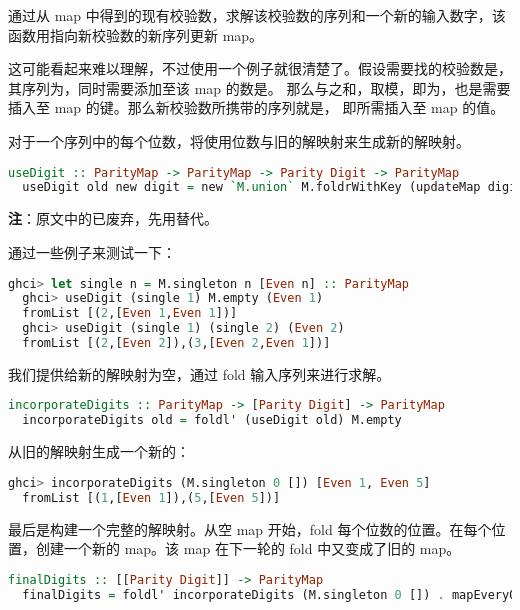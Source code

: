 \documentclass[./main.tex]{subfiles}
\begin{document}
通过从 map 中得到的现有校验数，求解该校验数的序列和一个新的输入数字，该函数用指向新校验数的新序列更新 map。

这可能看起来难以理解，不过使用一个例子就很清楚了。假设需要找的校验数是，其序列为\acode{[1,3]}，同时需要添加至该 map 的数是。
那么与之和，取模，即为，也是需要插入至 map 的键。那么新校验数所携带的序列就是\acode{[8,1,3]}，
即所需插入至 map 的值。

对于一个序列中的每个位数，将使用位数与旧的解映射来生成新的解映射。

\begin{lstlisting}[language=Haskell]
  useDigit :: ParityMap -> ParityMap -> Parity Digit -> ParityMap
  useDigit old new digit = new `M.union` M.foldrWithKey (updateMap digit) M.empty old
\end{lstlisting}

\textbf{注}：原文中的已废弃，先用替代。

通过一些例子来测试一下：

\begin{lstlisting}[language=Haskell]
  ghci> let single n = M.singleton n [Even n] :: ParityMap
  ghci> useDigit (single 1) M.empty (Even 1)
  fromList [(2,[Even 1,Even 1])]
  ghci> useDigit (single 1) (single 2) (Even 2)
  fromList [(2,[Even 2]),(3,[Even 2,Even 1])]
\end{lstlisting}

我们提供给新的解映射为空，通过 fold 输入序列来进行求解。

\begin{lstlisting}[language=Haskell]
  incorporateDigits :: ParityMap -> [Parity Digit] -> ParityMap
  incorporateDigits old = foldl' (useDigit old) M.empty
\end{lstlisting}

从旧的解映射生成一个新的：

\begin{lstlisting}[language=Haskell]
  ghci> incorporateDigits (M.singleton 0 []) [Even 1, Even 5]
  fromList [(1,[Even 1]),(5,[Even 5])]
\end{lstlisting}

最后是构建一个完整的解映射。从空 map 开始，fold 每个位数的位置。在每个位置，创建一个新的 map。该 map 在下一轮的 fold 中又变成了旧的 map。

\begin{lstlisting}[language=Haskell]
  finalDigits :: [[Parity Digit]] -> ParityMap
  finalDigits = foldl' incorporateDigits (M.singleton 0 []) . mapEveryOther (map $ fmap (* 3))
\end{lstlisting}
\end{document}
